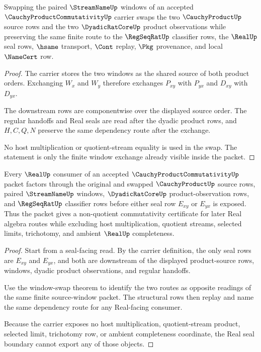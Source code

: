 \begin{theorem}
\label{thm:cauchy-product-commutativity-window-swap}
Swapping the paired $\StreamNameUp$ windows of an accepted $\CauchyProductCommutativityUp$ carrier swaps the two $\CauchyProductUp$ source rows and the two $\DyadicRatCoreUp$ product observations while preserving the same finite route to the $\RegSeqRatUp$ classifier rows, the $\RealUp$ seal rows, $\hsame$ transport, $\Cont$ replay, $\Pkg$ provenance, and local $\NameCert$ row.
\end{theorem}
\begin{proof}
The carrier stores the two windows as the shared source of both product orders. Exchanging $W_x$ and $W_y$ therefore exchanges $P_{xy}$ with $P_{yx}$ and $D_{xy}$ with $D_{yx}$.

The downstream rows are componentwise over the displayed source order. The regular handoffs and Real seals are read after the dyadic product rows, and $H,C,Q,N$ preserve the same dependency route after the exchange.

No host multiplication or quotient-stream equality is used in the swap. The statement is only the finite window exchange already visible inside the packet.
\end{proof}

\begin{theorem}
\label{thm:cauchy-product-commutativity-real-seal-boundary}
Every $\RealUp$ consumer of an accepted $\CauchyProductCommutativityUp$ packet factors through the original and swapped $\CauchyProductUp$ source rows, paired $\StreamNameUp$ windows, $\DyadicRatCoreUp$ product-observation rows, and $\RegSeqRatUp$ classifier rows before either seal row $E_{xy}$ or $E_{yx}$ is exposed. Thus the packet gives a non-quotient commutativity certificate for later Real algebra routes while excluding host multiplication, quotient streams, selected limits, trichotomy, and ambient $\RealUp$ completeness.
\end{theorem}
\begin{proof}
Start from a seal-facing read. By the carrier definition, the only seal rows are $E_{xy}$ and $E_{yx}$, and both are downstream of the displayed product-source rows, windows, dyadic product observations, and regular handoffs.

Use the window-swap theorem to identify the two routes as opposite readings of the same finite source-window packet. The structural rows then replay and name the same dependency route for any Real-facing consumer.

Because the carrier exposes no host multiplication, quotient-stream product, selected limit, trichotomy row, or ambient completeness coordinate, the Real seal boundary cannot export any of those objects.
\end{proof}

